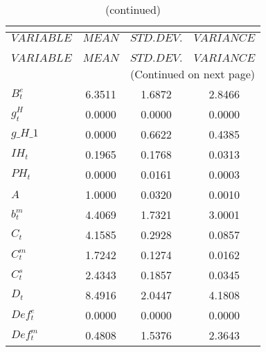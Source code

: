  
\begin{center}
\begin{longtable}{lccc} 
\caption{THEORETICAL MOMENTS}\\
 \label{Table:th_moments}\\
\toprule 
$VARIABLE                   $	 & 	 $         MEAN$	 & 	 $    STD. DEV.$	 & 	 $     VARIANCE$\\
\midrule \endfirsthead 
\caption{(continued)}\\
 \toprule \\ 
$VARIABLE                   $	 & 	 $         MEAN$	 & 	 $    STD. DEV.$	 & 	 $     VARIANCE$\\
\midrule \endhead 
\midrule \multicolumn{4}{r}{(Continued on next page)} \\ \bottomrule \endfoot 
\bottomrule \endlastfoot 
$B^e_t                      $	 & 	       6.3511	 & 	       1.6872	 & 	       2.8466 \\ 
$g^H_t                      $	 & 	       0.0000	 & 	       0.0000	 & 	       0.0000 \\ 
$g\_H\_1                    $	 & 	       0.0000	 & 	       0.6622	 & 	       0.4385 \\ 
$IH_t                       $	 & 	       0.1965	 & 	       0.1768	 & 	       0.0313 \\ 
$PH_t                       $	 & 	       0.0000	 & 	       0.0161	 & 	       0.0003 \\ 
$ A                         $	 & 	       1.0000	 & 	       0.0320	 & 	       0.0010 \\ 
$ b^m_t                     $	 & 	       4.4069	 & 	       1.7321	 & 	       3.0001 \\ 
$ C_t                       $	 & 	       4.1585	 & 	       0.2928	 & 	       0.0857 \\ 
$ C^m_t                     $	 & 	       1.7242	 & 	       0.1274	 & 	       0.0162 \\ 
$ C^s_t                     $	 & 	       2.4343	 & 	       0.1857	 & 	       0.0345 \\ 
$ D_t                       $	 & 	       8.4916	 & 	       2.0447	 & 	       4.1808 \\ 
$ Def^e_t                   $	 & 	       0.0000	 & 	       0.0000	 & 	       0.0000 \\ 
$ Def^m_t                   $	 & 	       0.4808	 & 	       1.5376	 & 	       2.3643 \\ 

\end{longtable}
\end{center}
